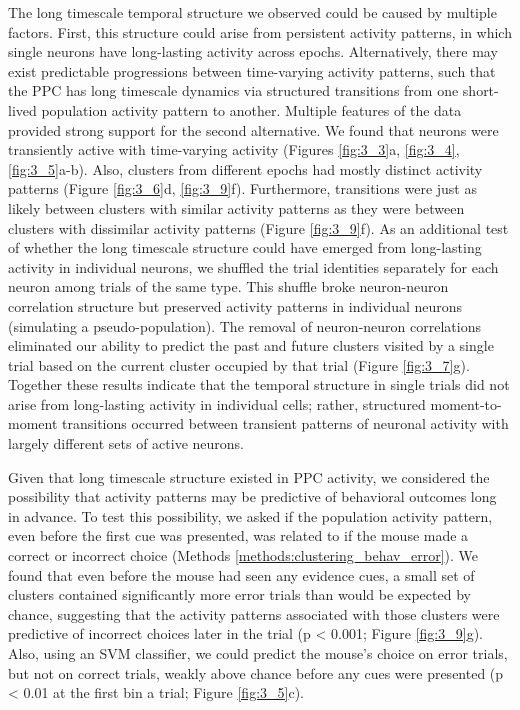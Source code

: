 \bigskip
The long timescale temporal structure we observed could be caused by multiple factors. First, this structure could arise from persistent activity patterns, in which single neurons have long-lasting activity across epochs. Alternatively, there may exist predictable progressions between time-varying activity patterns, such that the PPC has long timescale dynamics via structured transitions from one short-lived population activity pattern to another. Multiple features of the data provided strong support for the second alternative. We found that neurons were transiently active with time-varying activity (Figures \ref{fig:3_3}a, \ref{fig:3_4}, \ref{fig:3_5}a-b). Also, clusters from different epochs had mostly distinct activity patterns (Figure \ref{fig:3_6}d, \ref{fig:3_9}f). Furthermore, transitions were just as likely between clusters with similar activity patterns as they were between clusters with dissimilar activity patterns (Figure \ref{fig:3_9}f). As an additional test of whether the long timescale structure could have emerged from long-lasting activity in individual neurons, we shuffled the trial identities separately for each neuron among trials of the same type. This shuffle broke neuron-neuron correlation structure but preserved activity patterns in individual neurons (simulating a pseudo-population). The removal of neuron-neuron correlations eliminated our ability to predict the past and future clusters visited by a single trial based on the current cluster occupied by that trial (Figure \ref{fig:3_7}g). Together these results indicate that the temporal structure in single trials did not arise from long-lasting activity in individual cells; rather, structured moment-to-moment transitions occurred between transient patterns of neuronal activity with largely different sets of active neurons.

\bigskip
Given that long timescale structure existed in PPC activity, we considered the possibility that activity patterns may be predictive of behavioral outcomes long in advance. To test this possibility, we asked if the population activity pattern, even before the first cue was presented, was related to if the mouse made a correct or incorrect choice (Methods \ref{methods:clustering_behav_error}). We found that even before the mouse had seen any evidence cues, a small set of clusters contained significantly more error trials than would be expected by chance, suggesting that the activity patterns associated with those clusters were predictive of incorrect choices later in the trial (p < 0.001; Figure \ref{fig:3_9}g). Also, using an SVM classifier, we could predict the mouse’s choice on error trials, but not on correct trials, weakly above chance before any cues were presented (p < 0.01 at the first bin a trial; Figure \ref{fig:3_5}c).

